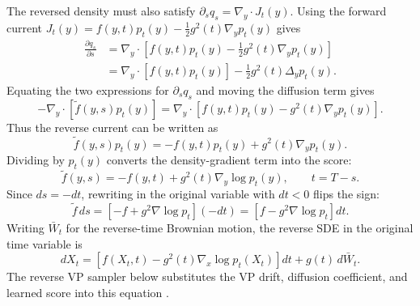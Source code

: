 \documentclass[reprint,amsmath,amssymb,aps,pra,10pt]{revtex4-2}
\begin{document}
The reversed density must also satisfy $\partial_s q_s=\nabla_y\cdot J_t(y)$.
Using the forward current $J_t(y)=f(y,t)p_t(y)-\frac{1}{2}g^2(t)\nabla_y p_t(y)$ gives
\begin{equation}
    \begin{aligned}
        \frac{\partial q_s}{\partial s}
        &=
        \nabla_y\cdot
        \left[
            f(y,t)p_t(y)
            -
            \frac{1}{2}
            g^2(t)\nabla_y p_t(y)
        \right]
        \\
        &=
        \nabla_y\cdot
        \left[
            f(y,t)p_t(y)
        \right]
        -
        \frac{1}{2}
        g^2(t)\Delta_y p_t(y).
    \end{aligned}
\end{equation}
Equating the two expressions for $\partial_s q_s$ and moving the diffusion term gives
\begin{equation}
    -
    \nabla_y\cdot
    \left[
        \tilde f(y,s)p_t(y)
    \right]
    =
    \nabla_y\cdot
    \left[
        f(y,t)p_t(y)
        -
        g^2(t)\nabla_y p_t(y)
    \right].
\end{equation}
Thus the reverse current can be written as
\begin{equation}
    \tilde f(y,s)p_t(y)
    =
    -
    f(y,t)p_t(y)
    +
    g^2(t)\nabla_y p_t(y).
\end{equation}
Dividing by $p_t(y)$ converts the density-gradient term into the score:
\begin{equation}
    \tilde f(y,s)
    =
    -
    f(y,t)
    +
    g^2(t)\nabla_y\log p_t(y),
    \qquad
    t=T-s.
\end{equation}
Since $ds=-dt$, rewriting in the original variable with $dt<0$ flips the sign:
\begin{equation}
    \tilde f\,ds
    =
    \left[
        -
        f
        +
        g^2\nabla\log p_t
    \right](-dt)
    =
    \left[
        f
        -
        g^2\nabla\log p_t
    \right]dt.
\end{equation}
Writing $\bar W_t$ for the reverse-time Brownian motion, the reverse SDE in the original time variable is
\begin{equation}
    dX_t
    =
    \left[
        f(X_t,t)
        -
        g^2(t)
        \nabla_x\log p_t(X_t)
    \right]dt
    +
    g(t)\,d\bar W_t.
\end{equation}
The reverse VP sampler below substitutes the VP drift, diffusion coefficient, and learned score into this equation \cite{song2021}.
\end{document}

